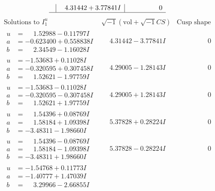 \documentclass[1p]{elsarticle_modified}
\theoremstyle{definition}
\newcommand{\I}{\sqrt{-1}}
\begin{document}
$$\begin{array}{c|c|c}
 & \phantom{-}4.31442 + 3.77841 I & \phantom{-0.000000 } 0\\
 \hline 
 \end{array}$$\newpage$$\begin{array}{c|c|c}  
\text{Solutions to }I^u_{1}& \I (\text{vol} + \sqrt{-1}CS) & \text{Cusp shape}\\
 \hline 
\begin{aligned}
u &= \phantom{-}1.52988 - 0.11797 I \\
a &= -0.623400 + 0.558838 I \\
b &= \phantom{-}2.34549 - 1.16028 I\end{aligned}
 & \phantom{-}4.31442 - 3.77841 I & \phantom{-0.000000 } 0 \\ \hline\begin{aligned}
u &= -1.53683 + 0.11028 I \\
a &= -0.320595 + 0.307458 I \\
b &= \phantom{-}1.52621 - 1.97759 I\end{aligned}
 & \phantom{-}4.29005 - 1.28143 I & \phantom{-0.000000 } 0 \\ \hline\begin{aligned}
u &= -1.53683 - 0.11028 I \\
a &= -0.320595 - 0.307458 I \\
b &= \phantom{-}1.52621 + 1.97759 I\end{aligned}
 & \phantom{-}4.29005 + 1.28143 I & \phantom{-0.000000 } 0 \\ \hline\begin{aligned}
u &= \phantom{-}1.54396 + 0.08769 I \\
a &= \phantom{-}1.58184 + 1.09398 I \\
b &= -3.48311 - 1.98660 I\end{aligned}
 & \phantom{-}5.37828 + 0.28224 I & \phantom{-0.000000 } 0 \\ \hline\begin{aligned}
u &= \phantom{-}1.54396 - 0.08769 I \\
a &= \phantom{-}1.58184 - 1.09398 I \\
b &= -3.48311 + 1.98660 I\end{aligned}
 & \phantom{-}5.37828 - 0.28224 I & \phantom{-0.000000 } 0 \\ \hline\begin{aligned}
u &= -1.54768 + 0.11773 I \\
a &= -1.40777 + 1.47039 I \\
b &= \phantom{-}3.29966 - 2.66855 I\end{aligned}

\end{array}$$
\end{document}
